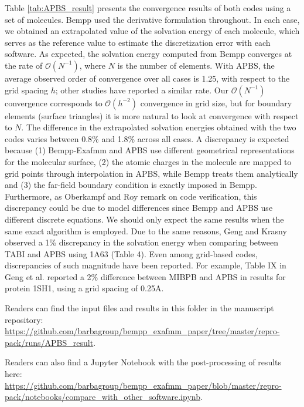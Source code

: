 \documentclass[11pt]{article}
\begin{document}
Table \ref{tab:APBS_result} presents the convergence results of both codes using a set of molecules.
Bempp used the derivative formulation throughout.
In each case, we obtained an extrapolated value of the solvation energy of each molecule, which serves as the reference value to estimate the discretization error with each software.
As expected, the solvation energy computed from Bempp converges at the rate of $\mathcal{O}(N^{-1})$, where $N$ is the number of elements.
With APBS, the average observed order of convergence over all cases is 1.25, with respect to the grid spacing $h$; other studies \cite{CooperBardhanBarba2014,GengKrasny2013} have reported a similar rate. 
Our $\mathcal{O}(N^{-1})$ convergence corresponds to $\mathcal{O}(h^{-2})$ convergence in grid size, but for boundary elements (surface triangles) it is more natural to look at convergence with respect to $N$.
The difference in the extrapolated solvation energies obtained with the two codes varies between 0.8\% and 1.8\% across all cases.
A discrepancy is expected because (1) Bempp-Exafmm and APBS use different geometrical representations for the molecular surface, (2) the atomic charges in the molecule are mapped to grid points through interpolation in APBS, while Bempp treats them analytically and (3) the far-field boundary condition is exactly imposed in Bempp.
Furthermore, as Oberkampf and Roy \cite{oberkampf_roy_2010} remark on code verification, this discrepancy could be due to model differences since Bempp and APBS use different discrete equations.
We should only expect the same results when the same exact algorithm is employed.
Due to the same reasons, Geng and Krasny \cite{GengKrasny2013} observed a 1\% discrepancy in the solvation energy when comparing between TABI and APBS using 1A63 (Table 4).
Even among grid-based codes, discrepancies of such magnitude have been reported.
For example, Table IX in Geng et al. \cite{gengTreatmentChargeSingularities2007} reported a 2\% difference between MIBPB and APBS in results for protein 1SH1, using a grid spacing of 0.25A.

\bigskip

Readers can find the input files and results in this folder in the manuscript repository: \url{https://github.com/barbagroup/bempp_exafmm_paper/tree/master/repro-pack/runs/APBS_result}.

Readers can also find a Jupyter Notebook with the post-processing of results here: \url{https://github.com/barbagroup/bempp_exafmm_paper/blob/master/repro-pack/notebooks/compare_with_other_software.ipynb}.
\end{document}
